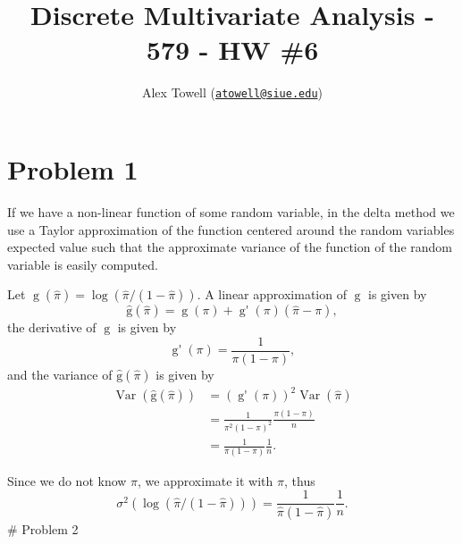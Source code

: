 \documentclass[
]{article}
\title{Discrete Multivariate Analysis - 579 - HW \#6}
\author{Alex Towell
(\href{mailto:atowell@siue.edu}{\nolinkurl{atowell@siue.edu}})}
\date{}
\begin{document}
\maketitle

\newcommand{\var}{\operatorname{Var}}
\newcommand{\expect}{\operatorname{E}}
\newcommand{\corr}{\operatorname{Corr}}
\newcommand{\cov}{\operatorname{Cov}}
\newcommand{\ssr}{\operatorname{SSR}}
\newcommand{\se}{\operatorname{SE}}
\newcommand{\mat}[1]{\mathbf{#1}}
\newcommand{\RR}{\operatorname{RR}}
\newcommand{\eval}[2]{\left. #1 \right\vert_{#2}}

\hypertarget{problem-1}{%
\section{Problem 1}\label{problem-1}}


If we have a non-linear function of some random variable, in the delta
method we use a Taylor approximation of the function centered around the
random variables expected value such that the approximate variance of
the function of the random variable is easily computed.

Let \(\operatorname{g}(\hat\pi) = \log(\hat\pi/(1-\hat\pi))\). A linear
approximation of \(\operatorname{g}\) is given by \[
  \operatorname{\hat g}(\hat\pi) = \operatorname{g}(\pi) +\operatorname{g'}(\pi)(\hat\pi - \pi),
\] the derivative of \(\operatorname{g}\) is given by \[
  \operatorname{g'}(\pi) = \frac{1}{\pi(1-\pi)},
\] and the variance of \(\operatorname{\hat g}(\hat\pi)\) is given by
\begin{align*}
  \operatorname{Var}(\operatorname{\hat g}(\hat \pi))
    &= \left(\operatorname{g'}(\pi)\right)^2 \operatorname{Var}(\hat\pi)\\
    &= \frac{1}{\pi^2(1-\pi)^2} \frac{\pi(1-\pi)}{n}\\
    &= \frac{1}{\pi(1-\pi)} \frac{1}{n}.
\end{align*}

Since we do not know \(\pi\), we approximate it with \(\hat\pi\), thus
\[
  \sigma^2(\log(\hat\pi/(1-\hat\pi))) = \frac{1}{\hat\pi(1-\hat\pi)} \frac{1}{n}.
\] \# Problem 2
\end{document}
